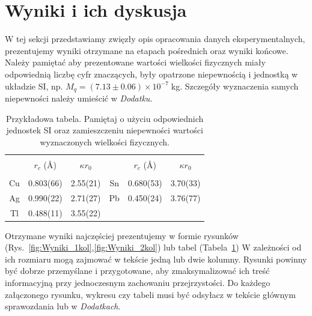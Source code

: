 \documentclass[twocolumn, a4paper, polish, 10pt]{article}
\begin{document}
\section{Wyniki i ich dyskusja}
W tej sekcji przedstawiamy zwięzły opis opracowania danych eksperymentalnych, prezentujemy wyniki otrzymane na etapach pośrednich oraz wyniki końcowe. Należy pamiętać aby prezentowane wartości wielkości fizycznych miały odpowiednią liczbę cyfr znaczących, były opatrzone niepewnością i jednostką w układzie SI, np. $M_q=(7.13\pm0.06) \times 10^{-7}\;$kg. Szczegóły wyznaczenia samych niepewności należy umieścić w \emph{Dodatku}.
\begin{table}[b]
\begin{center}
\renewcommand*{\tablename}{Tabela}
\caption{\small Przykładowa tabela. Pamiętaj o użyciu odpowiednich jednostek SI oraz zamieszczeniu niepewności wartości wyznaczonych wielkości fizycznych.\vspace{0.15cm}
    \label{tab:wyniki}}
    {\small
    \begin{tabular}{c c c c c c}
    \hline \vspace{-0.35cm} \\
      & $r_c$ ({\AA}) & $\kappa r_0$ &  & $r_c$ ({\AA}) & $\kappa r_0$ \\ \hline \vspace{-0.2cm} \\
     Cu & 0.803(66) & 2.55(21) & Sn & 0.680(53) & 3.70(33) \\
     Ag & 0.990(22) & 2.71(27) & Pb & 0.450(24) & 3.76(77) \\
     Tl & 0.488(11) & 3.55(22) & & &  \vspace{0.1cm} \\
    \hline
    \end{tabular}}
    \end{center}
\end{table}
Otrzymane wyniki najczęściej prezentujemy w formie rysunków (Rys.~\ref{fig:Wyniki_1kol},\ref{fig:Wyniki_2kol}) lub tabel (Tabela~\ref{tab:wyniki}) W zależności od ich rozmiaru mogą zajmować w tekście jedną lub dwie kolumny. Rysunki powinny być dobrze przemyślane i przygotowane, aby zmaksymalizować ich treść informacyjną przy jednoczesnym zachowaniu przejrzystości. Do każdego załączonego rysunku, wykresu czy tabeli musi być odsyłacz w tekście głównym sprawozdania lub w \emph{Dodatkach}.
\end{document}
